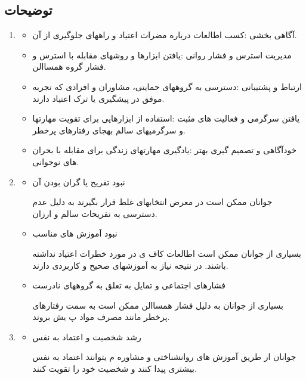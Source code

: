\documentclass[dvipsnames, svgnames, x11names, 11pt]{article}
\begin{document}
\subsection{توضیحات}
\begin{enumerate}
\item {}
\begin{itemize}
\item 
آگاهی بخشی :کسب اطالعات درباره مضرات اعتیاد و راههای جلوگیری از آن.
\item 
مدیریت استرس و فشار روانی :یافتن ابزارها و روشهای مقابله با استرس و فشار گروه همساالن.

\item 
ارتباط و پشتیبانی :دسترسی به گروههای حمایتی، مشاوران و افرادی که تجربه موفق در پیشگیری یا ترک اعتیاد دارند.

\item 
یافتن سرگرمی و فعالیت های مثبت :استفاده از ابزارهایی برای تقویت مهارتها و سرگرمیهای سالم بهجای رفتارهای پرخطر.

\item 
خودآگاهی و تصمیم گیری بهتر :یادگیری مهارتهای زندگی برای مقابله با بحران های نوجوانی.
\end{itemize}

\item {}

\begin{itemize}
\item 
نبود تفریح یا گران بودن آن

جوانان ممکن است در معرض انتخابهای غلط قرار بگیرند به دلیل عدم دسترسی به تفریحات سالم و ارزان.

\item 
نبود آموزش های مناسب

بسیاری از جوانان ممکن است اطالعات کاف ی در مورد خطرات اعتیاد نداشته باشند. در نتیجه نیاز به آموزشهای صحیح و کاربردی دارند.

\item 
فشارهای اجتماعی و تمایل به تعلق به گروههای نادرست

بسیاری از جوانان به دلیل فشار همساالن ممکن است به سمت رفتارهای پرخطر مانند مصرف مواد پ یش بروند.
\end{itemize}

\item {}
\begin{itemize}
\item 
رشد شخصیت و اعتماد به نفس

جوانان از طریق آموزش های روانشناختی و مشاوره م یتوانند اعتماد به نفس بیشتری پیدا کنند و شخصیت خود را تقویت کنند.


\end{itemize}
\end{enumerate}
\end{document}
